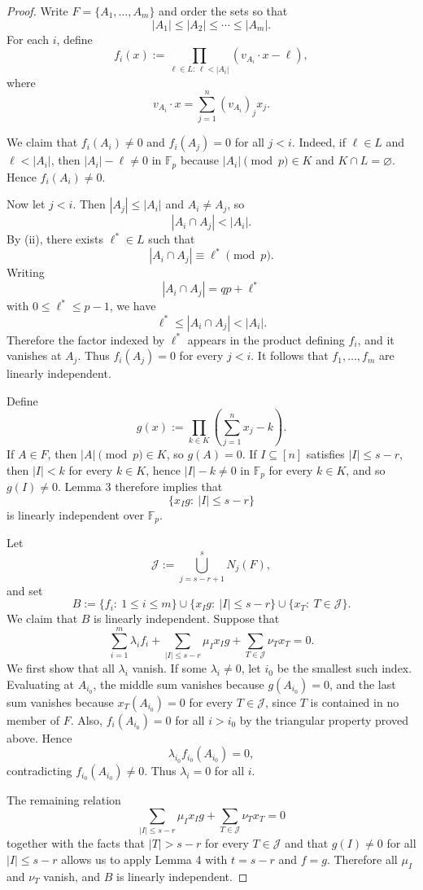 \documentclass[10pt,a4paper]{amsart}
\begin{document}
\begin{proof}
Write $F=\{A_1,\ldots,A_m\}$ and order the sets so that
$$
|A_1|\le |A_2|\le \cdots \le |A_m|.
$$
For each $i$, define
$$
f_i(x):=\prod_{\ell\in L:\,\ell<|A_i|}(v_{A_i}\cdot x-\ell),
$$
where
$$
v_{A_i}\cdot x=\sum_{j=1}^n (v_{A_i})_j x_j.
$$

We claim that $f_i(A_i)\neq 0$ and $f_i(A_j)=0$ for all $j<i$. Indeed, if $\ell\in L$ and
$\ell<|A_i|$, then $|A_i|-\ell\neq 0$ in $\mathbb F_p$ because $|A_i| \pmod p \in K$ and
$K\cap L=\varnothing$. Hence $f_i(A_i)\neq 0$.

Now let $j<i$. Then $|A_j|\le |A_i|$ and $A_i\neq A_j$, so
$$
|A_i\cap A_j|<|A_i|.
$$
By (ii), there exists $\ell^*\in L$ such that
$$
|A_i\cap A_j|\equiv \ell^* \pmod p.
$$
Writing
$$
|A_i\cap A_j|=qp+\ell^*
$$
with $0\le \ell^*\le p-1$, we have
$$
\ell^*\le |A_i\cap A_j|<|A_i|.
$$
Therefore the factor indexed by $\ell^*$ appears in the product defining $f_i$, and it vanishes at
$A_j$. Thus $f_i(A_j)=0$ for every $j<i$. It follows that $f_1,\ldots,f_m$ are linearly
independent.

Define
$$
g(x):=\prod_{k\in K}\left(\sum_{j=1}^n x_j-k\right).
$$
If $A\in F$, then $|A|\pmod p\in K$, so $g(A)=0$. If $I\subseteq [n]$ satisfies $|I|\le s-r$, then
$|I|<k$ for every $k\in K$, hence $|I|-k\neq 0$ in $\mathbb F_p$ for every $k\in K$, and so
$g(I)\neq 0$. Lemma 3 therefore implies that
$$
\{x_Ig:\ |I|\le s-r\}
$$
is linearly independent over $\mathbb F_p$.

Let
$$
\mathcal J:=\bigcup_{j=s-r+1}^{s} N_j(F),
$$
and set
$$
B:=\{f_i:\ 1\le i\le m\}\cup \{x_Ig:\ |I|\le s-r\}\cup \{x_T:\ T\in\mathcal J\}.
$$
We claim that $B$ is linearly independent. Suppose that
$$
\sum_{i=1}^m \lambda_i f_i+\sum_{|I|\le s-r}\mu_Ix_Ig+\sum_{T\in\mathcal J}\nu_Tx_T=0.
$$
We first show that all $\lambda_i$ vanish. If some $\lambda_i\neq 0$, let $i_0$ be the smallest such
index. Evaluating at $A_{i_0}$, the middle sum vanishes because $g(A_{i_0})=0$, and the last sum
vanishes because $x_T(A_{i_0})=0$ for every $T\in\mathcal J$, since $T$ is contained in no member
of $F$. Also, $f_i(A_{i_0})=0$ for all $i>i_0$ by the triangular property proved above. Hence
$$
\lambda_{i_0}f_{i_0}(A_{i_0})=0,
$$
contradicting $f_{i_0}(A_{i_0})\neq 0$. Thus $\lambda_i=0$ for all $i$.

The remaining relation
$$
\sum_{|I|\le s-r}\mu_Ix_Ig+\sum_{T\in\mathcal J}\nu_Tx_T=0
$$
together with the facts that $|T|>s-r$ for every $T\in\mathcal J$ and that $g(I)\neq 0$ for all
$|I|\le s-r$ allows us to apply Lemma 4 with $t=s-r$ and $f=g$. Therefore all $\mu_I$ and
$\nu_T$ vanish, and $B$ is linearly independent.


\end{proof}
\end{document}
